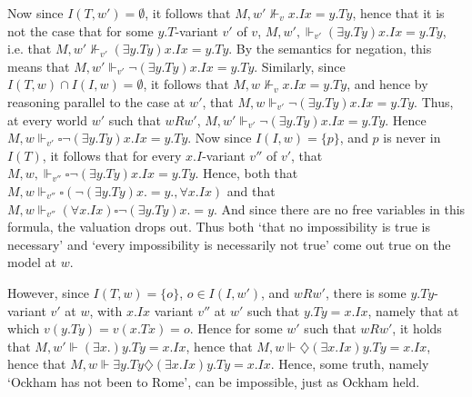 		Now since $I(T, w') = \emptyset$, it follows that $M, w' \nVdash_{v} x.Ix = y.Ty$, hence that it is not the case that for some $y.T$-variant $v'$ of $v$, $M, w', \Vdash_{v'} (\exists y.Ty)x.Ix = y.Ty$, i.e. that $M, w' \nVdash_{v'} (\exists y.Ty)x.Ix = y.Ty$. By the semantics for negation, this means that $M, w' \Vdash_{v'} \neg(\exists y.Ty)x.Ix = y.Ty$. Similarly, since $I(T, w) \cap I(I, w) = \emptyset$, it follows that $M, w \nVdash_{v} x.Ix = y.Ty$, and hence by  reasoning parallel to the case at $w'$, that $M, w \Vdash_{v'} \neg(\exists y.Ty)x.Ix = y.Ty$. Thus, at every world $w'$ such that $wRw'$, $M, w' \Vdash_{v'} \neg(\exists y.Ty)x.Ix=y.Ty$. Hence $M, w \Vdash_{v'} \square \neg(\exists y.Ty)x.Ix=y.Ty$. Now since $I(I, w) = \{p\}$, and $p$ is never in $I(T)$, it follows that for every $x.I$-variant $v''$ of $v'$, that $M, w, \Vdash_{v''} \square \neg (\exists y.Ty) x.Ix = y.Ty$. Hence, both that $M, w \Vdash_{v''} \square(\neg(\exists y.Ty)x.=y., \forall x.Ix)$ and that $M, w \Vdash_{v''} (\forall x.Ix) \square \neg (\exists y.Ty) x.=y.$ And since there are no free variables in this formula, the valuation drops out. Thus both `that no impossibility is true is necessary' and `every impossibility is necessarily not true' come out true on the model at $w$. 
		
		However, since $I(T, w) = \{o\}$, $o \in I(I, w')$, and $wRw'$, there is some $y.Ty$-variant $v'$ at $w$, with $x.Ix$ variant $v''$ at $w'$ such that $y.Ty = x.Ix$, namely that at which $v(y.Ty) = v(x.Tx) = o$. Hence for some $w'$ such that $wRw'$, it holds that $M, w' \Vdash (\exists x.)y.Ty = x.Ix$, hence that $M, w \Vdash \diamondsuit (\exists x.Ix)y.Ty = x.Ix$, hence that $M, w \Vdash \exists y.Ty \diamondsuit (\exists x.Ix)y.Ty = x.Ix$. Hence, some truth, namely `Ockham has not been to Rome', can be impossible, just as Ockham held. 
